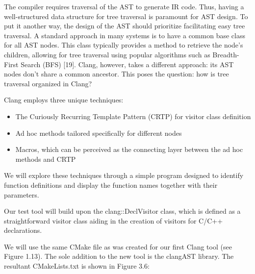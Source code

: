 The compiler requires traversal of the AST to generate IR code. Thus, having a well-structured data structure for tree traversal is paramount for AST design. To put it another way, the design of the AST should prioritize facilitating easy tree traversal. A standard approach in many systems is to have a common base class for all AST nodes. This class typically provides a method to retrieve the node's children, allowing for tree traversal using popular algorithms such as Breadth-First Search (BFS) [19]. Clang, however, takes a different approach: its AST nodes don't share a common ancestor. This poses the question: how is tree traversal organized in Clang?

Clang employs three unique techniques:

\begin{itemize}
\item
The Curiously Recurring Template Pattern (CRTP) for visitor class definition

\item
Ad hoc methods tailored specifically for different nodes

\item
Macros, which can be perceived as the connecting layer between the ad hoc methods and CRTP
\end{itemize}

We will explore these techniques through a simple program designed to identify function definitions and display the function names together with their parameters.


Our test tool will build upon the clang::DeclVisitor class, which is defined as a straightforward visitor class aiding in the creation of visitors for C/C++ declarations.

We will use the same CMake file as was created for our first Clang tool (see Figure 1.13). The sole addition to the new tool is the clangAST library. The resultant CMakeLists.txt is shown in Figure 3.6:



